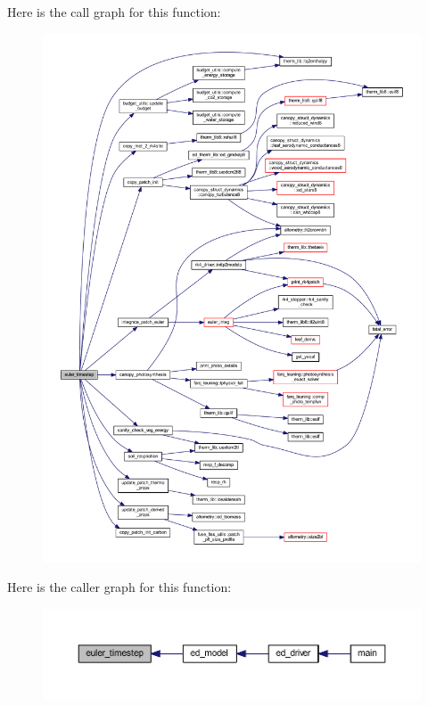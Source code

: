 Here is the call graph for this function\+:\nopagebreak
\begin{figure}[H]
\begin{center}
\leavevmode
\includegraphics[width=350pt]{euler__driver_8f90_a5219f633b6d9b0d321429096e0d3ea66_cgraph}
\end{center}
\end{figure}




Here is the caller graph for this function\+:\nopagebreak
\begin{figure}[H]
\begin{center}
\leavevmode
\includegraphics[width=350pt]{euler__driver_8f90_a5219f633b6d9b0d321429096e0d3ea66_icgraph}
\end{center}
\end{figure}


